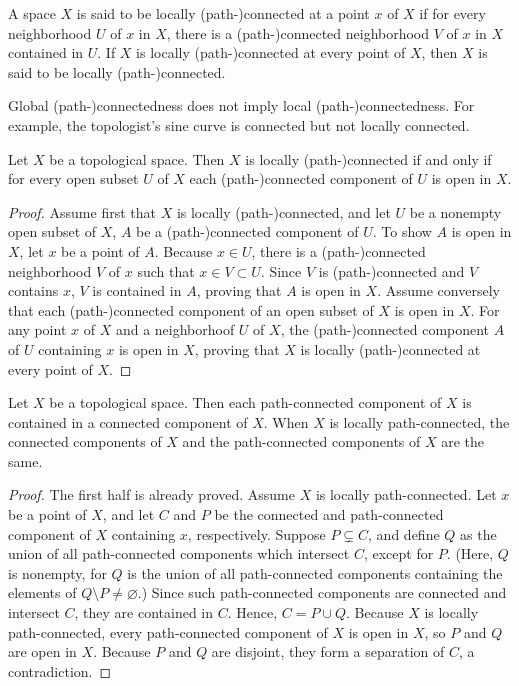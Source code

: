 \begin{defi}
    A space $X$ is said to be locally (path-)connected at a point $x$ of $X$ if for every neighborhood $U$ of $x$ in $X$, there is a (path-)connected neighborhood $V$ of $x$ in $X$ contained in $U$.
    If $X$ is locally (path-)connected at every point of $X$, then $X$ is said to be locally (path-)connected.
\end{defi}
\begin{rmk}
    Global (path-)connectedness does not imply local (path-)connectedness.
    For example, the topologist's sine curve is connected but not locally connected.
\end{rmk}

\begin{prop}
    Let $X$ be a topological space.
    Then $X$ is locally (path-)connected if and only if for every open subset $U$ of $X$ each (path-)connected component of $U$ is open in $X$.
\end{prop}
\begin{proof}
    Assume first that $X$ is locally (path-)connected, and let $U$ be a nonempty open subset of $X$, $A$ be a (path-)connected component of $U$.
    To show $A$ is open in $X$, let $x$ be a point of $A$.
    Because $x\in U$, there is a (path-)connected neighborhood $V$ of $x$ such that $x\in V\subset U$.
    Since $V$ is (path-)connected and $V$ contains $x$, $V$ is contained in $A$, proving that $A$ is open in $X$.
    Assume conversely that each (path-)connected component of an open subset of $X$ is open in $X$.
    For any point $x$ of $X$ and a neighborhoof $U$ of $X$, the (path-)connected component $A$ of $U$ containing $x$ is open in $X$, proving that $X$ is locally (path-)connected at every point of $X$.
\end{proof}

\begin{thm}
    Let $X$ be a topological space.
    Then each path-connected component of $X$ is contained in a connected component of $X$.
    When $X$ is locally path-connected, the connected components of $X$ and the path-connected components of $X$ are the same.
\end{thm}
\begin{proof}
    The first half is already proved.
    Assume $X$ is locally path-connected.
    Let $x$ be a point of $X$, and let $C$ and $P$ be the connected and path-connected component of $X$ containing $x$, respectively.
    Suppose $P\subsetneq C$, and define $Q$ as the union of all path-connected components which intersect $C$, except for $P$. (Here, $Q$ is nonempty, for $Q$ is the union of all path-connected components containing the elements of $Q\setminus P\neq\varnothing$.)
    Since such path-connected components are connected and intersect $C$, they are contained in $C$.
    Hence, $C=P\cup Q$.
    Because $X$ is locally path-connected, every path-connected component of $X$ is open in $X$, so $P$ and $Q$ are open in $X$.
    Because $P$ and $Q$ are disjoint, they form a separation of $C$, a contradiction.
\end{proof}

